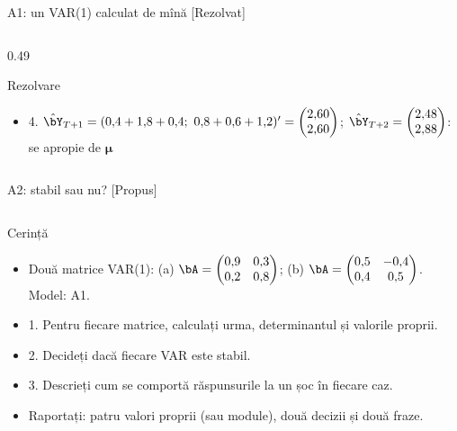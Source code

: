 \begin{frame}{A1: un VAR(1) calculat de mînă [Rezolvat]}
\begin{columns}[T]
\begin{column}{0.49\textwidth}
\begin{exampleblock}{Rezolvare}
\begin{itemize}
    \item 4. $\hat\bY_{T+1} = (0{,}4 + 1{,}8 + 0{,}4;\ 0{,}8 + 0{,}6 + 1{,}2)' = \begin{pmatrix} 2{,}60 \\ 2{,}60 \end{pmatrix}$; $\hat\bY_{T+2} = \begin{pmatrix} 2{,}48 \\ 2{,}88 \end{pmatrix}$: se apropie de $\boldsymbol{\mu}$
\end{itemize}
\end{exampleblock}
\end{column}
\end{columns}
\end{frame}

\begin{frame}{A2: stabil sau nu? [Propus]}
\propsub
\itemsize{\scriptsize}
\begin{columns}[T]
\begin{column}{\taskw}
\begin{block}{Cerință}
\begin{itemize}
    \item Două matrice VAR(1): (a) $\bA = \begin{pmatrix} 0{,}9 & 0{,}3 \\ 0{,}2 & 0{,}8 \end{pmatrix}$; (b) $\bA = \begin{pmatrix} 0{,}5 & -0{,}4 \\ 0{,}4 & 0{,}5 \end{pmatrix}$. Model: A1.
    \item 1. Pentru fiecare matrice, calculați urma, determinantul și valorile proprii.
    \item 2. Decideți dacă fiecare VAR este stabil.
    \item 3. Descrieți cum se comportă răspunsurile la un șoc în fiecare caz.
    \item Raportați: patru valori proprii (sau module), două decizii și două fraze.
\end{itemize}
\end{block}
\end{column}
\begin{column}{\solw}
\end{column}
\end{columns}
\end{frame}
